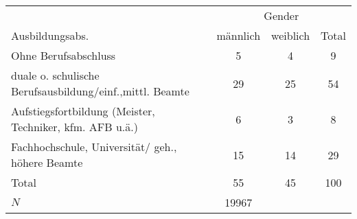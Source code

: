 \begin{tabular}{l*{3}{c}}
\toprule
            &\multicolumn{3}{c}{Gender}            \\\cmidrule(lr){2-4}
Ausbildungsabs.&    männlich&    weiblich&       Total\\
\midrule
Ohne Berufsabschluss&           5&           4&           9\\
duale o. schulische Berufsausbildung/einf.,mittl. Beamte&          29&          25&          54\\
Aufstiegsfortbildung (Meister, Techniker, kfm. AFB u.ä.)&           6&           3&           8\\
Fachhochschule, Universität/ geh., höhere Beamte&          15&          14&          29\\
Total       &          55&          45&         100\\
\midrule
\(N\)       &       19967&            &            \\
\bottomrule
\end{tabular}
